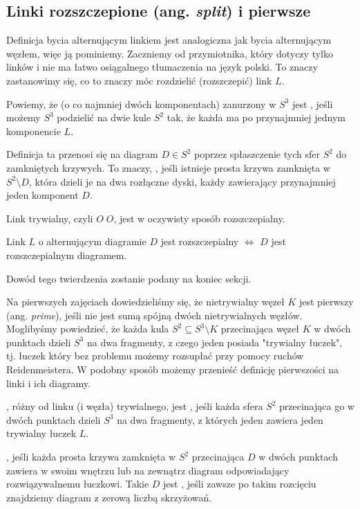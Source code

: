\documentclass{article}
\begin{document}
\subsection{Linki rozszczepione (ang. \emph{split}) i pierwsze}

Definicja bycia alternującym linkiem jest analogiczna jak bycia alternującym węzłem, więc ją pominiemy. Zaczniemy od przymiotnika, który dotyczy tylko linków i nie ma łatwo osiągalnego tłumaczenia na język polski. To znaczy zastanowimy się, co to znaczy móc rozdzielić (rozszczepić) link $L$.

\begin{deff}
  Powiemy, że  (o co najmniej dwóch komponentach) zanurzony w $S^3$ jest , jeśli możemy $S^3$ podzielić na dwie kule $S^2$ tak, że każda ma po przynajmniej jednym komponencie $L$. 

  Definicja ta przenosi się na diagram $D\in S^2$ poprzez spłaszczenie tych sfer $S^2$ do zamkniętych krzywych. To znaczy, , jeśli istnieje prosta krzywa zamknięta w $S^2\setminus D$, która dzieli je na dwa rozłączne dyski, każdy zawierający przynajmniej jeden komponent $D$.
\end{deff}

Link trywialny, czyli $O\;O$, jest w oczywisty sposób rozszczepialny.

\begin{thm}
  Link $L$ o alternującym diagramie $D$ jest rozszczepialny $\iff$ $D$ jest rozszczepialnym diagramem.
\end{thm}

{\color{red}
Dowód tego twierdzenia zostanie podany na koniec sekcji.
}

Na pierwszych zajęciach dowiedzieliśmy się, że nietrywialny węzeł $K$ jest pierwszy (ang. \emph{prime}), jeśli nie jest sumą spójną dwóch nietrywialnych węzłów. Moglibyśmy powiedzieć, że każda kula $S^2\subseteq S^3\setminus K$ przecinająca węzeł $K$ w dwóch punktach dzieli $S^3$ na dwa fragmenty, z czego jeden posiada "trywialny łuczek", tj. łuczek który bez problemu możemy rozsupłać przy pomocy ruchów Reidenmeistera. W podobny sposób możemy przenieść definicję pierwszości na linki i ich diagramy.

\begin{deff}
  , różny od linku (i węzła) trywialnego, jest , jeśli każda sfera $S^2$ przecinająca go w dwóch punktach dzieli $S^3$ na dwa fragmenty, z których jeden zawiera jeden trywialny łuczek $L$.

  , jeśli każda prosta krzywa zamknięta w $S^2$ przecinająca $D$ w dwóch punktach zawiera w swoim wnętrzu lub na zewnątrz diagram odpowiadający rozwiązywalnemu łuczkowi. Takie $D$ jest , jeśli zawsze po takim rozcięciu znajdziemy diagram z zerową liczbą skrzyżowań. 
\end{deff}
\end{document}
